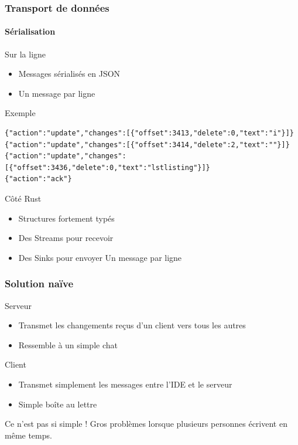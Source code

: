 \documentclass{beamer}
\begin{document}
\begin{frame}[fragile]
    \frametitle{Transport de données}
    \framesubtitle{Sérialisation}
    \begin{block}{Sur la ligne}
        \begin{itemize}
            \item Messages sérialisés en JSON
            \item Un message par ligne
        \end{itemize}
    \end{block}
    \begin{exampleblock}{Exemple}
        \begin{lstlisting}
{"action":"update","changes":[{"offset":3413,"delete":0,"text":"i"}]}
{"action":"update","changes":[{"offset":3414,"delete":2,"text":""}]}
{"action":"update","changes":[{"offset":3436,"delete":0,"text":"lstlisting"}]}
{"action":"ack"}
        \end{lstlisting}
    \end{exampleblock}
    \begin{block}{Côté Rust}
        \begin{itemize}
            \item Structures fortement typés
            \item Des Streams pour recevoir
            \item Des Sinks pour envoyer Un message par ligne
        \end{itemize}
    \end{block}
\end{frame}

\begin{frame}
    \frametitle{Solution naïve}

    \begin{block}{Serveur}
        \begin{itemize}
            \item Transmet les changements reçus d'un client vers tous les autres
            \item Ressemble à un simple chat
        \end{itemize}
    \end{block}
    \begin{block}{Client}
        \begin{itemize}
            \item Transmet simplement les messages entre l'IDE et le serveur
            \item Simple boîte au lettre
        \end{itemize}
    \end{block}
    \begin{alertblock}{Ce n'est pas si simple !}
        Gros problèmes lorsque plusieurs personnes écrivent en même temps.
    \end{alertblock}
\end{frame}
\end{document}
